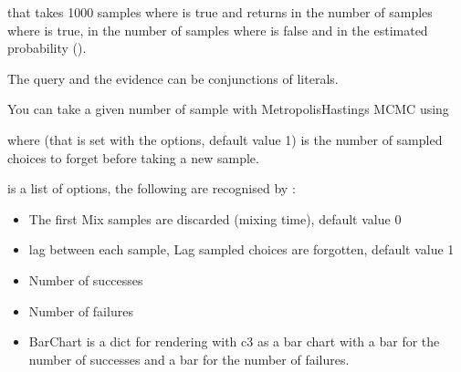 \documentclass[letterpaper,10pt,english]{sphinxmanual}
\begin{document}
\sphinxAtStartPar
that takes 1000 samples where  is true and returns in  the number of samples where  is true, in  the number of samples where  is false and in  the estimated probability ().

\sphinxAtStartPar
The query and the evidence can be conjunctions of literals.

\sphinxAtStartPar
You can take a given number of sample with Metropolis\sphinxhyphen{}Hastings MCMC using

\begin{sphinxVerbatim}[commandchars=\\\{\}]
  
\end{sphinxVerbatim}

\sphinxAtStartPar
where  (that is set with the options, default value 1) is the number of sampled choices to forget before taking a new sample.

\sphinxAtStartPar
{} is a list of options, the following are recognised by :
\begin{itemize}
\item {} 
\sphinxAtStartPar
{} The first Mix samples are discarded (mixing time), default value 0

\item {} 
\sphinxAtStartPar
{} lag between each sample, Lag sampled choices are forgotten, default value 1

\item {} 
\sphinxAtStartPar
{} Number of successes

\item {} 
\sphinxAtStartPar
{} Number of failures

\item {} 
\sphinxAtStartPar
{} BarChart is a dict for rendering with c3 as a bar chart with a bar for the number of successes and a bar for the number of failures.

\end{itemize}
\end{document}
